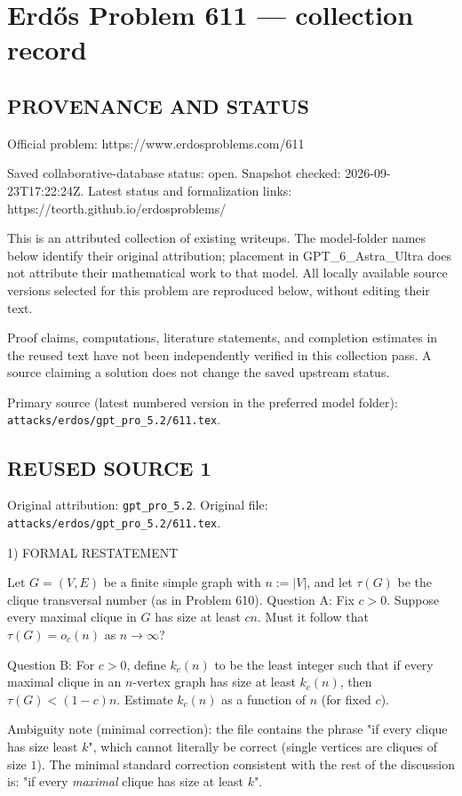 \section*{Erd\H{o}s Problem 611 --- collection record}

\subsection*{PROVENANCE AND STATUS}
Official problem: https://www.erdosproblems.com/611

Saved collaborative-database status: open.
Snapshot checked: 2026-09-23T17:22:24Z.
Latest status and formalization links: https://teorth.github.io/erdosproblems/

This is an attributed collection of existing writeups. The model-folder names below identify their original attribution; placement in GPT\_6\_Astra\_Ultra does not attribute their mathematical work to that model. All locally available source versions selected for this problem are reproduced below, without editing their text.

Proof claims, computations, literature statements, and completion estimates in the reused text have not been independently verified in this collection pass. A source claiming a solution does not change the saved upstream status.

Primary source (latest numbered version in the preferred model folder): \texttt{attacks/erdos/gpt\_pro\_5.2/611.tex}.

\subsection*{REUSED SOURCE 1}
Original attribution: \texttt{gpt\_pro\_5.2}.
Original file: \texttt{attacks/erdos/gpt\_pro\_5.2/611.tex}.


1) FORMAL RESTATEMENT

Let $G=(V,E)$ be a finite simple graph with $n:=|V|$, and let $\tau(G)$ be the clique transversal number (as in Problem 610).
Question A: Fix $c>0$. Suppose every maximal clique in $G$ has size at least $cn$.
Must it follow that $\tau(G)=o_c(n)$ as $n\to\infty$?

Question B: For $c>0$, define $k_c(n)$ to be the least integer such that if every maximal clique in an $n$-vertex graph has size at least $k_c(n)$, then $\tau(G)<(1-c)n$.
Estimate $k_c(n)$ as a function of $n$ (for fixed $c$).

Ambiguity note (minimal correction): the file contains the phrase "if every clique has size least $k$", which cannot literally be correct (single vertices are cliques of size $1$).
The minimal standard correction consistent with the rest of the discussion is: "if every \emph{maximal} clique has size at least $k$".

